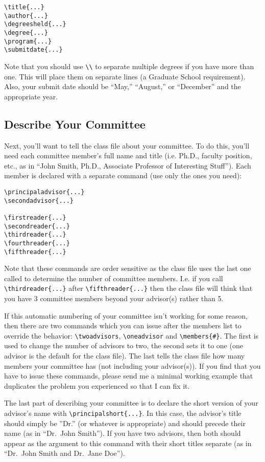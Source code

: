 \begin{verbatim}
\title{...}
\author{...}
\degreesheld{...}
\degree{...}
\program{...}
\submitdate{...}
\end{verbatim}

Note that you should use \verb=\\= to separate multiple degrees if you have more than one.  This will place them on separate lines (a Graduate School requirement).  Also, your submit date should be ``May,'' ``August,'' or ``December'' and the appropriate year.

\subsection{Describe Your Committee}\label{comm}
Next, you'll want to tell the class file about your committee.  To do this, you'll need each committee member's full name and title (i.e. Ph.D., faculty position, etc., as in ``John Smith, Ph.D., Associate Professor of Interesting Stuff'').  Each member is declared with a separate command (use only the ones you need):

\begin{verbatim}
\principaladvisor{...}
\secondadvisor{...}

\firstreader{...}
\secondreader{...}
\thirdreader{...}
\fourthreader{...}
\fifthreader{...}
\end{verbatim}

Note that these commands are order sensitive as the class file uses the last one called to determine the number of committee members.  I.e. if you call \verb=\thirdreader{...}= after \verb=\fifthreader{...}= then the class file will think that you have 3 committee members beyond your advisor(s) rather than 5.

If this automatic numbering of your committee isn't working for some reason, then there are two commands which you can issue after the members list to override the behavior: \verb=\twoadvisors=, \verb=\oneadvisor= and \verb=\members{#}=.  The first is used to change the number of advisors to two, the second sets it to one (one advisor is the default for the class file).  The last tells the class file how many members your committee has (not including your advisor(s)).  If you find that you have to issue these commands, please send me a minimal working example that duplicates the problem you experienced so that I can fix it.

The last part of describing your committee is to declare the short version of your advisor's name with \verb=\principalshort{...}=.  In this case, the advisor's title should simply be ''Dr.'' (or whatever is appropriate) and should precede their name (as in ``Dr.~John Smith'').  If you have two advisors, then both should appear as the argument to this command with their short titles separate (as in ``Dr.~John Smith and Dr.~Jane Doe'').

